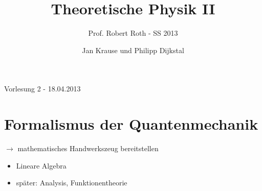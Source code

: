 \documentclass[10pt,article,colorback,accentcolor=tud9d]{scrartcl}
\title{Theoretische Physik II}
\subtitle{Prof. Robert Roth - SS 2013}
\author{Jan Krause und Philipp Dijkstal}
\date{ }
\begin{document}
\maketitle
\tableofcontents
\newpage
\begin{flushright}Vorlesung 2 - 18.04.2013\end{flushright}
\section{Formalismus der Quantenmechanik}
$\rightarrow$ mathematisches Handwerkszeug bereitstellen\\
\begin{itemize}
\item Lineare Algebra
\item später: Analysis, Funktionentheorie
\end{itemize}
\end{document}
